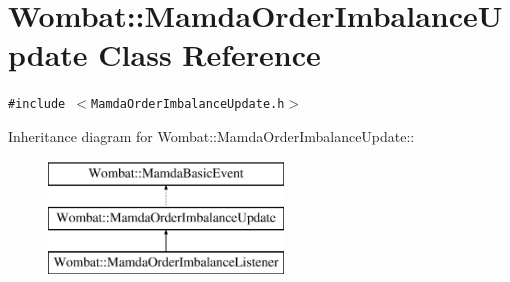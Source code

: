 \hypertarget{classWombat_1_1MamdaOrderImbalanceUpdate}{
\section{Wombat::Mamda\-Order\-Imbalance\-Update Class Reference}
\label{classWombat_1_1MamdaOrderImbalanceUpdate}
}
{\tt \#include $<$Mamda\-Order\-Imbalance\-Update.h$>$}

Inheritance diagram for Wombat::Mamda\-Order\-Imbalance\-Update::\begin{figure}[H]
\begin{center}
\leavevmode
\includegraphics[height=3cm]{classWombat_1_1MamdaOrderImbalanceUpdate}
\end{center}
\end{figure}
